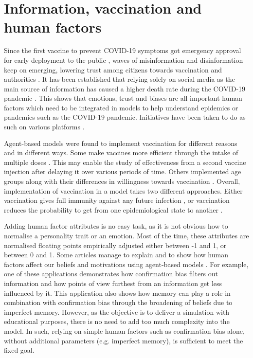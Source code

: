 \section{Information, vaccination and human factors}

Since the first vaccine to prevent COVID-19 symptoms got emergency approval for early deployment to the public \cite{who_first_covid-19_vaccine_2020}, waves of misinformation and disinformation keep on emerging, lowering trust among citizens towards vaccination and authorities \cite{enria2021trust, organisation2020transparency}.
It has been established that relying solely on social media as the main source of information has caused a higher death rate during the COVID-19 pandemic \cite{nieves2021infodemic}.
This shows that emotions, trust and biases are all important human factors which need to be integrated in models to help understand epidemics or pandemics such as the COVID-19 pandemic. Initiatives have been taken to do as such on various platforms \cite{bourgais2018emotion}.

Agent-based models were found to implement vaccination for different reasons and in different ways. Some make vaccines more efficient through the intake of multiple doses \cite{romero-brufau_public_2021}. This may enable the study of effectiveness from a second vaccine injection after delaying it over various periods of time. Others implemented age groups along with their differences in willingness towards vaccination \cite{jahn_targeted_2021}.
Overall, implementation of vaccination in a model takes two different approaches. Either vaccination gives full immunity against any future infection \cite{jahn_targeted_2021, truszkowska_high-resolution_2021, alagoz_impact_2021}, or vaccination reduces the probability to get from one epidemiological state to another \cite{romero-brufau_public_2021, faucher_agent-based_2022}.

Adding human factor attributes is no easy task, as it is not obvious how to normalise a personality trait or an emotion. Most of the time, these attributes are normalised floating points empirically adjusted either between -1 and 1, or between 0 and 1.
Some articles manage to explain and to show how human factors affect our beliefs and motivations using agent-based models \cite{adam_vigiflood_2020, sobkowicz2018, vaccines9080809}.
For example, one of these applications \cite{sobkowicz2018} demonstrates how confirmation bias filters out information and how points of view furthest from an information get less influenced by it. This application also shows how memory can play a role in combination with confirmation bias through the broadening of beliefs due to imperfect memory. However, as the objective is to deliver a simulation with educational purposes, there is no need to add too much complexity into the model. In such, relying on simple human factors such as confirmation bias alone, without additional parameters (e.g. imperfect memory), is sufficient to meet the fixed goal.



